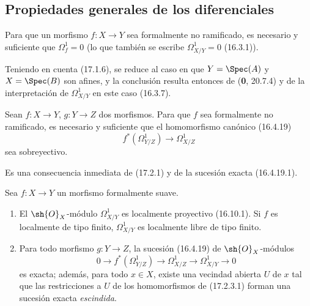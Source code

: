 \subsection{Propiedades generales de los diferenciales}
\label{subsection:IV.17.2}

\begin{proposition}[17.2.1]
\label{IV.17.2.1}
Para que un morfismo $f:X\to Y$ sea formalmente no ramificado, es necesario y suficiente que $\varOmega_f^1=0$ \textup{(lo que también se escribe $\varOmega_{X/Y}^1=0$ (16.3.1))}.
\end{proposition}

Teniendo en cuenta (17.1.6), se reduce al caso en que $Y=\Spec(A)$ y $X=\Spec(B)$ son afines, y la conclusión resulta entonces de (\textbf 0, 20.7.4) y de la interpretación de $\varOmega_{X/Y}^1$ en este caso (16.3.7).

\begin{corollary}[17.2.2]
\label{IV.17.2.2}
Sean $f:X\to Y$, $g:Y\to Z$ dos morfismos. Para que $f$ sea formalmente no ramificado, es necesario y suficiente que el homomorfismo canónico \textup{(16.4.19)}
\[
  f^*(\varOmega_{Y/Z}^1)\longrightarrow\varOmega_{X/Z}^1
\]
sea sobreyectivo.
\end{corollary}

Es una consecuencia inmediata de (17.2.1) y de la sucesión exacta (16.4.19.1).

\begin{proposition}[17.2.3]
\label{IV.17.2.3}
Sea $f:X\to Y$ un morfismo formalmente suave.
\begin{enumerate}
  \item[\textup{(i)}] El $\sh{O}_X$-módulo $\varOmega_{X/Y}^1$ es localmente proyectivo \textup{(16.10.1)}. Si $f$ es localmente de tipo finito, $\varOmega_{X/Y}^1$ es localmente libre de tipo finito.
  \item[\textup{(ii)}] Para todo morfismo $g:Y\to Z$, la sucesión \textup{(16.4.19)} de $\sh{O}_X$-módulos
  \[
  \label{IV.17.2.3.1}
    0\longrightarrow f^*(\varOmega_{Y/Z}^1)\longrightarrow\varOmega_{X/Z}^1\longrightarrow\varOmega_{X/Y}^1\longrightarrow0
    \tag{17.2.3.1}
  \]
  es exacta; además, para todo $x\in X$, existe una vecindad abierta $U$ de $x$ tal que las restricciones a $U$ de los homomorfismos de \textup{(17.2.3.1)} forman una sucesión exacta \emph{escindida}.
\end{enumerate}
\end{proposition}

